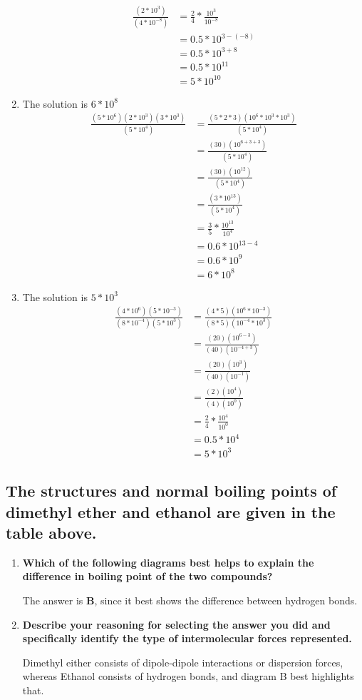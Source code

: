 \documentclass{scrartcl}
\begin{document}
\begin{enumerate}
\begin{align*}
\frac{(2*10^3)}{(4*10^{-8})}&=\frac{2}{4}*\frac{10^3}{10^{-8}}\\
&=0.5*10^{3-(-8)}\\
&=0.5*10^{3+8}\\
&=0.5*10^{11}\\
&=5*10^{10}
\end{align*}
\item The solution is \(6*10^8\)
\begin{align*}
\frac{(5*10^6)(2*10^3)(3*10^3)}{(5*10^4)}&=\frac{(5*2*3)(10^6*10^3*10^3)}{(5*10^4)}\\
&=\frac{(30)(10^{6+3+3})}{(5*10^4)}\\
&=\frac{(30)(10^{12})}{(5*10^4)}\\
&=\frac{(3*10^{13})}{(5*10^4)}\\
&=\frac{3}{5}*\frac{10^{13}}{10^4}\\
&=0.6*10^{13-4}\\
&=0.6*10^9\\
&=6*10^8
\end{align*}
\item The solution is \(5*10^3^{}\)
\begin{align*}
\frac{(4*10^6)(5*10^{-3})}{(8*10^{-4})(5*10^3)}&=\frac{(4*5)(10^6*10^{-3})}{(8*5)(10^{-4}*10^3)}\\
&=\frac{(20)(10^{6-3}^{})}{(40)(10^{-4+3})}\\
&=\frac{(20)(10^3)}{(40)(10^{-1})}^{}\\
&=\frac{(2)(10^4)}{(4)(10^0)}^{}\\
&=\frac{2}{4}*\frac{10^4}{10^0}\\
&=0.5*10^4\\
&=5*10^3
\end{align*}
\end{enumerate}

\subsection{The structures and normal boiling points of dimethyl ether and ethanol are given in the table above.}
\label{sec:orgfb62db9}
\begin{enumerate}
\item \textbf{Which of the following diagrams best helps to explain the difference in boiling point of the two compounds?}

The answer is \textbf{B}, since it best shows the difference between hydrogen bonds.

\item \textbf{Describe your reasoning for selecting the answer you did and specifically identify the type of intermolecular forces represented.}

Dimethyl either consists of dipole-dipole interactions or dispersion forces, whereas Ethanol consists of hydrogen bonds, and diagram B best highlights that.
\end{enumerate}
\end{document}
